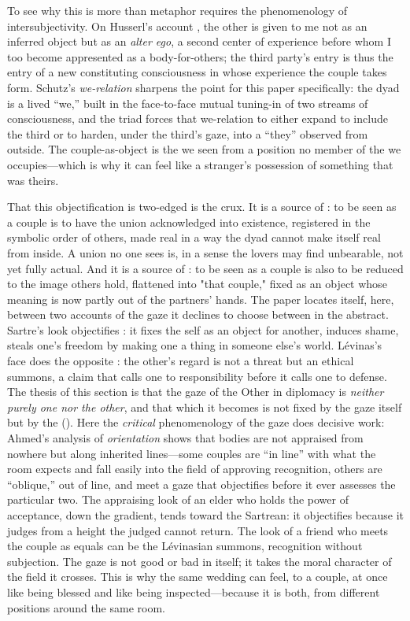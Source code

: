 To see why this is more than metaphor requires the phenomenology of intersubjectivity. On Husserl's account \parencite{husserl1931cm}, the other is given to me not as an inferred object but as an \emph{alter ego}, a second center of experience before whom I too become appresented as a body-for-others; the third party's entry is thus the entry of a new constituting consciousness in whose experience the couple takes form. Schutz's \emph{we-relation} \parencite{schutz1932} sharpens the point for this paper specifically: the dyad is a lived ``we,'' built in the face-to-face mutual tuning-in of two streams of consciousness, and the triad forces that we-relation to either expand to include the third or to harden, under the third's gaze, into a ``they'' observed from outside. The couple-as-object is the we seen from a position no member of the we occupies---which is why it can feel like a stranger's possession of something that was theirs.

That this objectification is two-edged is the crux. It is a source of : to be seen as a couple is to have the union acknowledged into existence, registered in the symbolic order of others, made real in a way the dyad cannot make itself real from inside. A union no one sees is, in a sense the lovers may find unbearable, not yet fully actual. And it is a source of : to be seen as a couple is also to be reduced to the image others hold, flattened into "that couple," fixed as an object whose meaning is now partly out of the partners' hands. The paper locates itself, here, between two accounts of the gaze it declines to choose between in the abstract. Sartre's look objectifies \parencite{sartre1943}: it fixes the self as an object for another, induces shame, steals one's freedom by making one a thing in someone else's world. Lévinas's face does the opposite \parencite{levinas1961}: the other's regard is not a threat but an ethical summons, a claim that calls one to responsibility before it calls one to defense. The thesis of this section is that the gaze of the Other in diplomacy is \emph{neither purely one nor the other}, and that which it becomes is not fixed by the gaze itself but by the  (). Here the \emph{critical} phenomenology of the gaze does decisive work: Ahmed's analysis of \emph{orientation} \parencite{ahmed2006queer} shows that bodies are not appraised from nowhere but along inherited lines---some couples are ``in line'' with what the room expects and fall easily into the field of approving recognition, others are ``oblique,'' out of line, and meet a gaze that objectifies before it ever assesses the particular two. The appraising look of an elder who holds the power of acceptance, down the gradient, tends toward the Sartrean: it objectifies because it judges from a height the judged cannot return. The look of a friend who meets the couple as equals can be the Lévinasian summons, recognition without subjection. The gaze is not good or bad in itself; it takes the moral character of the field it crosses. This is why the same wedding can feel, to a couple, at once like being blessed and like being inspected---because it is both, from different positions around the same room.

